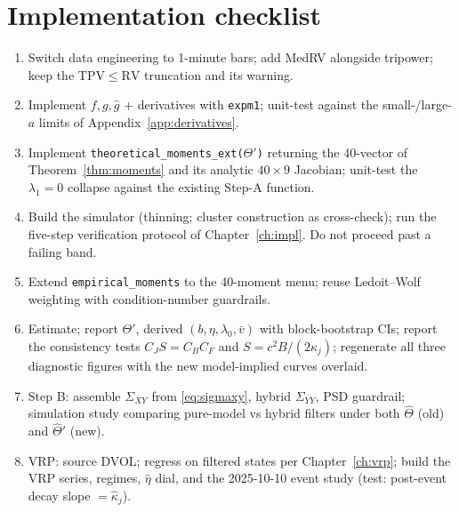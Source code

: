 \documentclass[11pt]{report}
\theoremstyle{definition}
\theoremstyle{remark}
\newcommand{\TPV}{\mathrm{TPV}}
\newcommand{\RV}{\mathrm{RV}}
\begin{document}
\chapter{Implementation checklist}
\label{app:checklist}
\begin{enumerate}
\item Switch data engineering to 1-minute bars; add MedRV alongside tripower;
keep the $\TPV\le\RV$ truncation and its warning.
\item Implement $f,g,\hat g$ + derivatives with \texttt{expm1}; unit-test
against the small-/large-$a$ limits of Appendix~\ref{app:derivatives}.
\item Implement \texttt{theoretical\_moments\_ext($\Theta'$)} returning the
40-vector of Theorem~\ref{thm:moments} and its analytic $40\times9$
Jacobian; unit-test the $\lambda_{1}=0$ collapse against the existing
Step-A function.
\item Build the simulator (thinning; cluster construction as cross-check);
run the five-step verification protocol of Chapter~\ref{ch:impl}. Do not
proceed past a failing band.
\item Extend \texttt{empirical\_moments} to the 40-moment menu; reuse
Ledoit--Wolf weighting with condition-number guardrails.
\item Estimate; report $\Theta'$, derived $(b,\eta,\lambda_{0},\bar v)$ with
block-bootstrap CIs; report the consistency tests $C_{J}S=C_{B}C_{F}$ and
$S=c^{2}B/(2\kappa_{j})$; regenerate all three diagnostic figures with the
new model-implied curves overlaid.
\item Step B: assemble $\Sigma_{XY}$ from \eqref{eq:sigmaxy}, hybrid
$\Sigma_{YY}$, PSD guardrail; simulation study comparing pure-model vs
hybrid filters under both $\hat\Theta$ (old) and $\hat\Theta'$ (new).
\item VRP: source DVOL; regress on filtered states per
Chapter~\ref{ch:vrp}; build the VRP series, regimes, $\hat\eta$ dial, and
the 2025-10-10 event study (test: post-event decay slope $=\hat\kappa_{j}$).
\end{enumerate}
\end{document}
